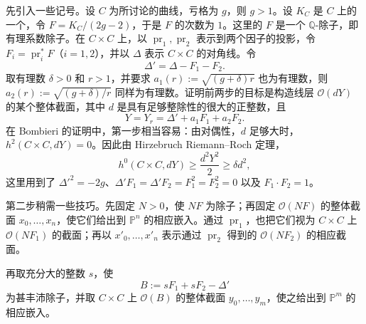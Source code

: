 先引入一些记号。设 $C$ 为所讨论的曲线，亏格为 $g$，则 $g>1$。设 $K_C$ 是 $C$ 上的一个，令 $F=K_C/(2g-2)$，于是 $F$ 的次数为 $1$。这里的 $F$ 是一个 $\mathbb Q$-除子，即有理系数除子。在 $C\times C$ 上，以 $\operatorname{pr}_1,\operatorname{pr}_2$ 表示到两个因子的投影，令 $F_i=\operatorname{pr}_i^*F$（$i=1,2$），并以 $\Delta$ 表示 $C\times C$ 的对角线。令
\[
\Delta'=\Delta-F_1-F_2.
\]
取有理数 $\delta>0$ 和 $r>1$，并要求 $a_1(r):=\sqrt{(g+\delta)r}$ 也为有理数，则 $a_2(r):=\sqrt{(g+\delta)/r}$ 同样为有理数。证明前两步的目标是构造线层 $\mathcal O(dY)$ 的某个整体截面，其中 $d$ 是具有足够整除性的很大的正整数，且
\[
Y=Y_r=\Delta'+a_1F_1+a_2F_2.
\]
在 Bombieri 的证明中，第一步相当容易：由对偶性，$d$ 足够大时，$h^2(C\times C,dY)=0$。因此由 Hirzebruch Riemann--Roch 定理，
\[
h^0(C\times C,dY)\ge\frac{d^2Y^2}{2}\ge\delta d^2,
\]
这里用到了 $\Delta'^2=-2g$、$\Delta'F_1=\Delta'F_2=F_1^2=F_2^2=0$ 以及 $F_1\cdot F_2=1$。

第二步稍需一些技巧。先固定 $N>0$，使 $NF$ 为除子；再固定 $\mathcal O(NF)$ 的整体截面 $x_0,\ldots,x_n$，使它们给出到 $\mathbb P^n$ 的相应嵌入。通过 $\operatorname{pr}_1$，也把它们视为 $C\times C$ 上 $\mathcal O(NF_1)$ 的截面；再以 $x'_0,\ldots,x'_n$ 表示通过 $\operatorname{pr}_2$ 得到的 $\mathcal O(NF_2)$ 的相应截面。

再取充分大的整数 $s$，使
\[
B:=sF_1+sF_2-\Delta'
\]
为甚丰沛除子，并取 $C\times C$ 上 $\mathcal O(B)$ 的整体截面 $y_0,\ldots,y_m$，使之给出到 $\mathbb P^m$ 的相应嵌入。

